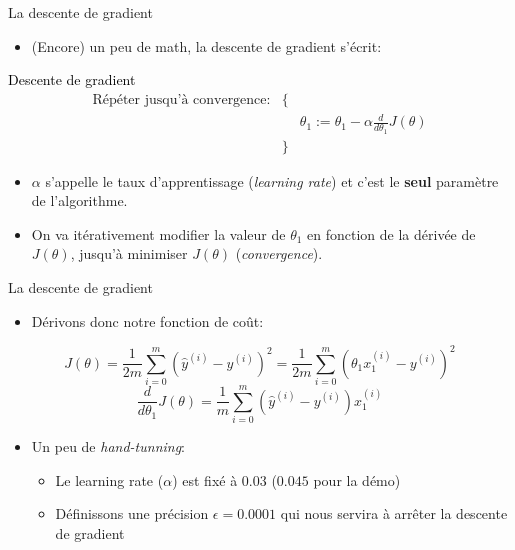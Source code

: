 \documentclass[11pt]{beamer}
\begin{document}
  
\begin{frame}{La descente de gradient}
  \begin{itemize}
  \item (Encore) un peu de math, la descente de gradient s'écrit:
  \end{itemize}
  \begin{beamerboxesrounded}[scheme=suppervise,width=\textwidth]{\textcolor{black}{Descente de gradient}}    
    \vspace{-0.2cm}
    \begin{equation*}
      \begin{matrix} \text{Répéter jusqu'à convergence:} & \{ & \\ & & \theta_{1} := \theta_{1} - \alpha \frac{d}{d\theta_{1}}J(\theta) \\ & \} & \end{matrix}
    \end{equation*}
    \vspace{-0.2cm}
    \end{beamerboxesrounded}
    \begin{itemize}
    \item $\alpha$ s'appelle le taux d'apprentissage (\textit{learning rate}) et c'est le \textbf{seul} paramètre de l'algorithme.
      \vspace{0.2cm}
    \item On va itérativement modifier la valeur de $\theta_{1}$ en fonction de la dérivée de $J(\theta)$, jusqu'à minimiser $J(\theta)$ (\textit{convergence}).
    \end{itemize}
\end{frame}

\begin{frame}{La descente de gradient}
  \begin{itemize}
  \item Dérivons donc notre fonction de coût:
  \end{itemize}
  \begin{equation*}
    J(\theta) = \frac{1}{2m} \displaystyle\sum_{i=0}^{m}(\hat{y}^{(i)} - y^{(i)})^{2} = \frac{1}{2m} \displaystyle\sum_{i=0}^{m}(\theta_{1}x_{1}^{(i)} - y^{(i)})^{2}
  \end{equation*}
  \begin{equation*}
      \frac{d}{d\theta_{1}}J(\theta) = \frac{1}{m}\displaystyle\sum_{i=0}^{m}(\hat{y}^{(i)} - y^{(i)}) x_{1}^{(i)}
  \end{equation*}
  \begin{itemize}
  \item Un peu de \textit{hand-tunning}:
    \begin{itemize}
      \normalsize
    \item Le learning rate ($\alpha$) est fixé à $0.03$ ($0.045$ pour la démo)
    \item Définissons une précision $\epsilon = 0.0001$ qui nous servira à arrêter la descente de gradient 
    \end{itemize}
  \end{itemize}
\end{frame}
\end{document}
